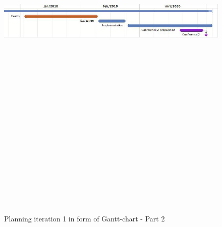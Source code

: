 \documentclass[salesmen, twoside]{../../../templates/latex/2009/softproj}
\begin{document}
\begin{projdoc}
				\begin{figure}
					\begin{center}
					\includegraphics[angle=90, height=20cm]{../../img/gantt-chart-1iter-2.jpg}
					\caption{Planning iteration 1 in form of Gantt-chart - Part 2}
				\end{center}
				\end{figure}
			

\end{projdoc}
\end{document}
